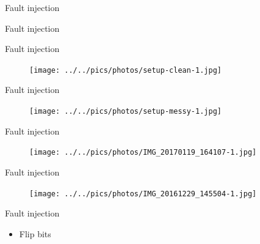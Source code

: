 \documentclass[table]{beamer}
\begin{document}
\begin{frame}{Fault injection}
    \begin{figure}[H]
    \centering
    \def\svgwidth{\columnwidth}
    
    \end{figure}
\end{frame}

\begin{frame}{Fault injection}
    \begin{figure}[H]
    \centering
    \def\svgwidth{\columnwidth}
    
    \end{figure}
\end{frame}

\begin{frame}{Fault injection}
    \begin{figure}[H]
      \centering
      \texttt{[image: ../../pics/photos/setup-clean-1.jpg]}
    \end{figure}
\end{frame}

\begin{frame}{Fault injection}
    \begin{figure}[H]
      \centering
      \texttt{[image: ../../pics/photos/setup-messy-1.jpg]}
    \end{figure}
\end{frame}

\begin{frame}{Fault injection}
    \begin{figure}[H]
      \centering
      \texttt{[image: ../../pics/photos/IMG\_20170119\_164107-1.jpg]}
    \end{figure}
\end{frame}


\begin{frame}{Fault injection}
    \begin{figure}[H]
      \centering
      \texttt{[image: ../../pics/photos/IMG\_20161229\_145504-1.jpg]}
    \end{figure}
\end{frame}

\begin{frame}{Fault injection}
    \begin{itemize}
        \item Flip bits
    \end{itemize}
\end{frame}

\end{document}
